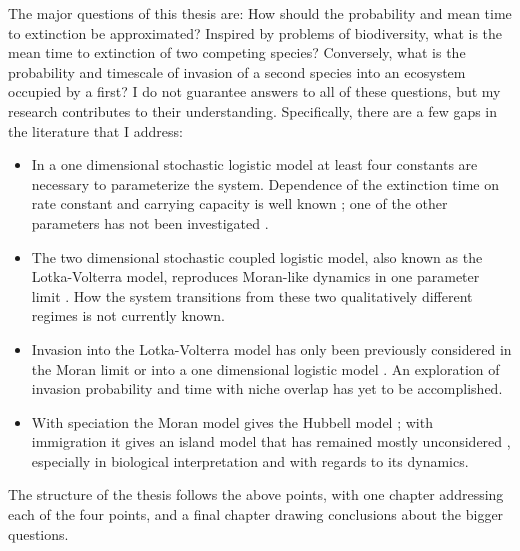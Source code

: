 The major questions of this thesis are:%
How should the probability and mean time to extinction be approximated? 
Inspired by problems of biodiversity, what is the mean time to extinction of two competing species? %
Conversely, what is the probability and timescale of invasion of a second species into an ecosystem occupied by a first? 
I do not guarantee answers to all of these questions, but my research contributes to their understanding. 
%
Specifically, there are a few gaps in the literature that I address: 
\begin{itemize}
	\item In a one dimensional stochastic logistic model at least four constants are necessary to parameterize the system. 
	Dependence of the extinction time on rate constant and carrying capacity is well known \cite{Norden1982,Dushoff2000,Nasell2001,Lambert2005,Assaf2006,Yu2017,Parsons2018}; one of the other parameters has not been investigated \cite{Haegeman2011}. 
	\item The two dimensional stochastic coupled logistic model, also known as the Lotka-Volterra model, reproduces Moran-like dynamics in one parameter limit \cite{Lin2012,Constable2015,Chotibut2015,Young2018}. 
	How the system transitions from these two qualitatively different regimes is not currently known. 
	\item Invasion into the Lotka-Volterra model has only been previously considered in the Moran limit \cite{McKane2004,Lambert2006,Parsons2007,Chalub2016} or into a one dimensional logistic model \cite{Parsons2018}. 
	An exploration of invasion probability and time with niche overlap has yet to be accomplished. 
	\item With speciation the Moran model gives the Hubbell model \cite{Hubbell2001,Leigh2007}; with immigration it gives an island model \cite{MacArthur1967} that has remained mostly unconsidered \cite{McKane2003}, especially in biological interpretation and with regards to its dynamics. 
\end{itemize}
%
The structure of the thesis follows the above points, with one chapter addressing each of the four points, and a final chapter drawing conclusions about the bigger questions. 

